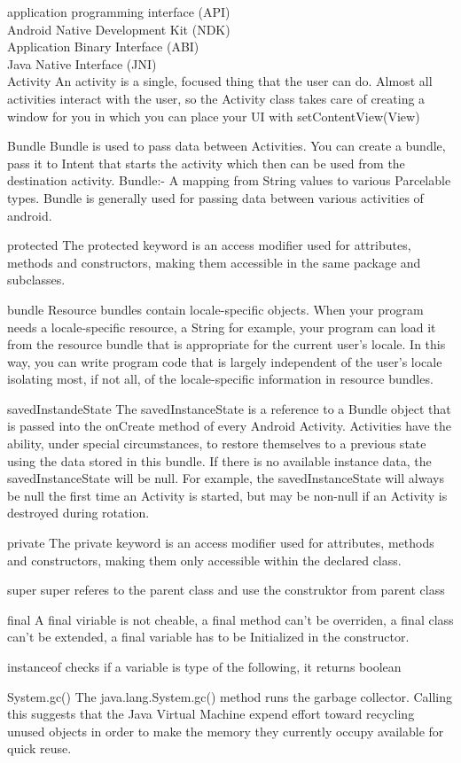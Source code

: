 \documentclass[a4paper,12pt]{article}
\begin{document}
application programming interface (API)\\
Android Native Development Kit (NDK) \\
Application Binary Interface (ABI) \\
Java Native Interface (JNI) \\

Activity
An activity is a single, focused thing that the user can do.
Almost all activities interact with the user, so the Activity class takes care of creating a window for you in which you can place your UI with setContentView(View)

Bundle
Bundle is used to pass data between Activities.
You can create a bundle, pass it to Intent that starts the activity which then can be used from the destination activity.
Bundle:- A mapping from String values to various Parcelable types. Bundle is generally used for passing data between various activities of android.


protected
The protected keyword is an access modifier used for attributes, methods and constructors, 
making them accessible in the same package and subclasses.

bundle
Resource bundles contain locale-specific objects.
 When your program needs a locale-specific resource, a String for example,
 your program can load it from the resource bundle that is appropriate for the current user's locale. In this way, 
you can write program code that is largely independent of the user's locale isolating most, if not all, 
of the locale-specific information in resource bundles.

savedInstandeState
The savedInstanceState is a reference to a Bundle object that is passed into the onCreate method of every Android Activity.
 Activities have the ability, under special circumstances, 
to restore themselves to a previous state using the data stored in this bundle.
 If there is no available instance data, the savedInstanceState will be null. For example, 
the savedInstanceState will always be null the first time an Activity is started, but may be non-null if an Activity is destroyed during rotation.

private
The private keyword is an access modifier used for attributes,
 methods and constructors, 
making them only accessible within the declared class.

super
super referes to the parent class and use the construktor from parent class

final
A final viriable is not cheable, a final method can't be overriden, a final class can't be extended, 
a final variable has to be Initialized in the constructor.


instanceof
checks if a variable is type of the following, it returns boolean

System.gc()
The java.lang.System.gc() method runs the garbage collector. 
Calling this suggests that the Java Virtual Machine expend effort 
toward recycling unused objects in order to make the memory they currently occupy available for quick reuse.
\end{document}
